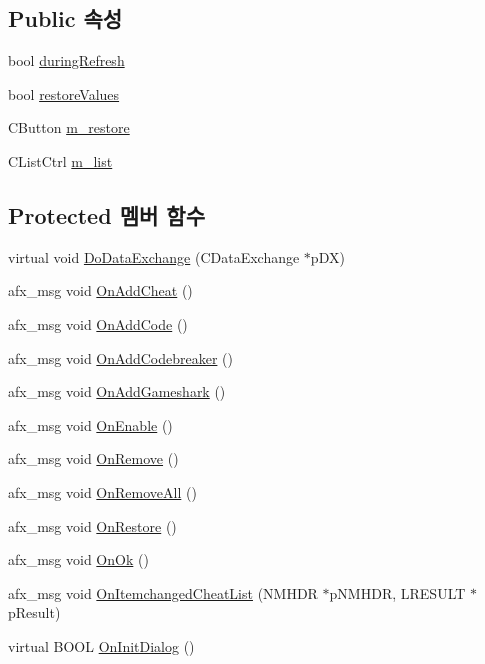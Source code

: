 \subsection*{Public 속성}
\begin{DoxyCompactItemize}
\item 
bool \mbox{\hyperlink{class_g_b_a_cheat_list_a799afe054e40958158b51a8d79b20b56}{during\+Refresh}}
\item 
bool \mbox{\hyperlink{class_g_b_a_cheat_list_a5a6fa66317a2fdab0f9880bd2056c1d0}{restore\+Values}}
\item 
C\+Button \mbox{\hyperlink{class_g_b_a_cheat_list_a4ed2a681da3265741caacda87cf36825}{m\+\_\+restore}}
\item 
C\+List\+Ctrl \mbox{\hyperlink{class_g_b_a_cheat_list_a00626f69b0783f81eaf76a4483ea76ed}{m\+\_\+list}}
\end{DoxyCompactItemize}
\subsection*{Protected 멤버 함수}
\begin{DoxyCompactItemize}
\item 
virtual void \mbox{\hyperlink{class_g_b_a_cheat_list_ad55813b6695ea45723684f1346efb938}{Do\+Data\+Exchange}} (C\+Data\+Exchange $\ast$p\+DX)
\item 
afx\+\_\+msg void \mbox{\hyperlink{class_g_b_a_cheat_list_a9e6ac22e19feef95ecd21881324e5d49}{On\+Add\+Cheat}} ()
\item 
afx\+\_\+msg void \mbox{\hyperlink{class_g_b_a_cheat_list_a6ac13ccfe979786032de5a836e9c35a6}{On\+Add\+Code}} ()
\item 
afx\+\_\+msg void \mbox{\hyperlink{class_g_b_a_cheat_list_a06eeb598a3bfdccf747014a7d3c996dc}{On\+Add\+Codebreaker}} ()
\item 
afx\+\_\+msg void \mbox{\hyperlink{class_g_b_a_cheat_list_acd2892992a12237aa208dbfe53331da2}{On\+Add\+Gameshark}} ()
\item 
afx\+\_\+msg void \mbox{\hyperlink{class_g_b_a_cheat_list_a22de639a60de7c74ffd176281df51b14}{On\+Enable}} ()
\item 
afx\+\_\+msg void \mbox{\hyperlink{class_g_b_a_cheat_list_ae8a0358fd127292dda615a647a6f36c9}{On\+Remove}} ()
\item 
afx\+\_\+msg void \mbox{\hyperlink{class_g_b_a_cheat_list_a41727af1d277cd0ac71b80e992b55ec9}{On\+Remove\+All}} ()
\item 
afx\+\_\+msg void \mbox{\hyperlink{class_g_b_a_cheat_list_a0fe16ba1b246f6baa133926505681012}{On\+Restore}} ()
\item 
afx\+\_\+msg void \mbox{\hyperlink{class_g_b_a_cheat_list_a32b955a45061f6e2fbeb513341b90bff}{On\+Ok}} ()
\item 
afx\+\_\+msg void \mbox{\hyperlink{class_g_b_a_cheat_list_a64182036127e2c73d0c79706cc1f2d1e}{On\+Itemchanged\+Cheat\+List}} (N\+M\+H\+DR $\ast$p\+N\+M\+H\+DR, L\+R\+E\+S\+U\+LT $\ast$p\+Result)
\item 
virtual B\+O\+OL \mbox{\hyperlink{class_g_b_a_cheat_list_ae6cfd528dfdae4f9e7f64df50a0771ed}{On\+Init\+Dialog}} ()
\end{DoxyCompactItemize}


